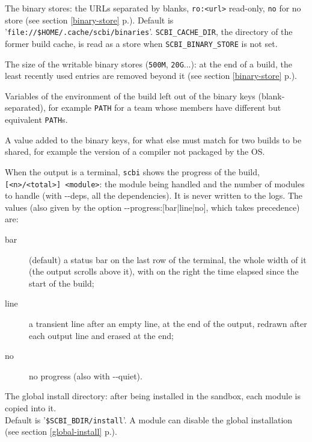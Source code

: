 \documentclass[a4paper,12pt,twoside]{article}
\let\olditem=\item
\def\myitem[#1]{\vspace{10pt}\olditem[#1]}
\newcommand{\code}[1]{\texttt{#1}}
\newcommand{\seeref}[1]{see section \ref{#1} p.\pageref{#1}}
\newcommand{\file}[1]{'{\texttt{#1}}'}
\newcommand{\ddash}{-{}-}
\begin{document}
\begin{description}[before=\let\item\myitem]
	\item[SCBI\_BINARY\_STORE] The binary stores: the URLs separated by blanks, \code{ro:<url>} read-only, \code{no} for no store (\seeref{binary-store}). Default is \file{file://\$HOME/.cache/scbi/binaries}. \code{SCBI\_CACHE\_DIR}, the directory of the former build cache, is read as a store when \code{SCBI\_BINARY\_STORE} is not set.

	\item[SCBI\_BINARY\_STORE\_MAX\_SIZE] The size of the writable binary stores (\code{500M}, \code{20G}...): at the end of a build, the least recently used entries are removed beyond it (\seeref{binary-store}).

	\item[SCBI\_BINARY\_KEY\_IGNORE] Variables of the environment of the build left out of the binary keys (blank-separated), for example \code{PATH} for a team whose members have different but equivalent \code{PATH}s.

	\item[SCBI\_BINARY\_KEY\_EXTRA] A value added to the binary keys, for what else must match for two builds to be shared, for example the version of a compiler not packaged by the OS.

	\item[SCBI\_PROGRESS] When the output is a terminal,
	\code{scbi} shows the progress of the build, \code{[<n>/<total>]
	<module>}: the module being handled and the number of modules to
	handle (with \ddash{}deps, all the dependencies). It is never written
	to the logs. The values (also given by the option
	\ddash{}progress:{[}bar|line|no{]}, which takes precedence) are:
	\begin{description}
		\item[bar] (default) a status bar on the last row of the terminal,
		the whole width of it (the output scrolls above it), with on the
		right the time elapsed since the start of the build;
		\item[line] a transient line after an empty line, at the end of
		the output, redrawn after each output line and erased at the end;
		\item[no] no progress (also with \ddash{}quiet).
	\end{description}

	\item[SCBI\_PREFIX] The global install directory: after being installed in the sandbox, each module is copied into it. \\Default is \file{\$SCBI\_BDIR/install}. A module can disable the global installation (\seeref{global-install}).


\end{description}
\end{document}
